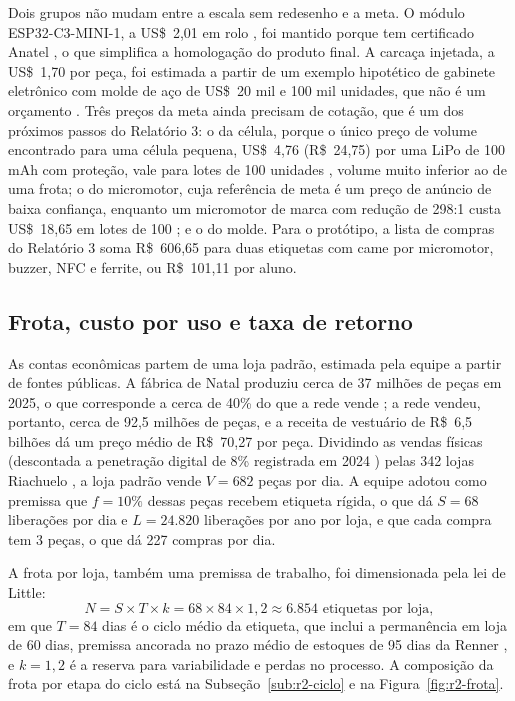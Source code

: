 Dois grupos não mudam entre a escala sem redesenho e a meta. O módulo ESP32-C3-MINI-1, a US\$~2,01 em rolo \cite{digikey2026esp32}, foi mantido porque tem certificado Anatel \cite{espressif2026certificados}, o que simplifica a homologação do produto final. A carcaça injetada, a US\$~1,70 por peça, foi estimada a partir de um exemplo hipotético de gabinete eletrônico com molde de aço de US\$~20 mil e 100 mil unidades, que não é um orçamento \cite{formlabs2026injecao}. Três preços da meta ainda precisam de cotação, que é um dos próximos passos do Relatório 3: o da célula, porque o único preço de volume encontrado para uma célula pequena, US\$~4,76 (R\$~24,75) por uma LiPo de 100\,mAh com proteção, vale para lotes de 100 unidades \cite{adafruit2026lipo}, volume muito inferior ao de uma frota; o do micromotor, cuja referência de meta é um preço de anúncio de baixa confiança, enquanto um micromotor de marca com redução de 298:1 custa US\$~18,65 em lotes de 100 \cite{pololu2026n20}; e o do molde. Para o protótipo, a lista de compras do Relatório 3 soma R\$~606,65 para duas etiquetas com came por micromotor, buzzer, NFC e ferrite, ou R\$~101,11 por aluno.

\subsection{Frota, custo por uso e taxa de retorno}
\label{sub:r2-custo-uso}

As contas econômicas partem de uma loja padrão, estimada pela equipe a partir de fontes públicas. A fábrica de Natal produziu cerca de 37 milhões de peças em 2025, o que corresponde a cerca de 40\% do que a rede vende \cite{bloomberglinea2026riachuelo}; a rede vendeu, portanto, cerca de 92,5 milhões de peças, e a receita de vestuário de R\$~6,5 bilhões \cite{abvtex2026riachuelo} dá um preço médio de R\$~70,27 por peça. Dividindo as vendas físicas (descontada a penetração digital de 8\% registrada em 2024 \cite{btg2025guararapes}) pelas 342 lojas Riachuelo \cite{abvtex2026riachuelo}, a loja padrão vende $V = 682$ peças por dia. A equipe adotou como premissa que $f = 10\%$ dessas peças recebem etiqueta rígida, o que dá $S = 68$ liberações por dia e $L = 24.820$ liberações por ano por loja, e que cada compra tem 3 peças, o que dá 227 compras por dia.

A frota por loja, também uma premissa de trabalho, foi dimensionada pela lei de Little:
\begin{equation}
N = S \times T \times k = 68 \times 84 \times 1{,}2 \approx 6.854 \text{ etiquetas por loja},
\end{equation}
em que $T = 84$ dias é o ciclo médio da etiqueta, que inclui a permanência em loja de 60 dias, premissa ancorada no prazo médio de estoques de 95 dias da Renner \cite{renner2026resultados}, e $k = 1{,}2$ é a reserva para variabilidade e perdas no processo. A composição da frota por etapa do ciclo está na Subseção~\ref{sub:r2-ciclo} e na Figura~\ref{fig:r2-frota}.

